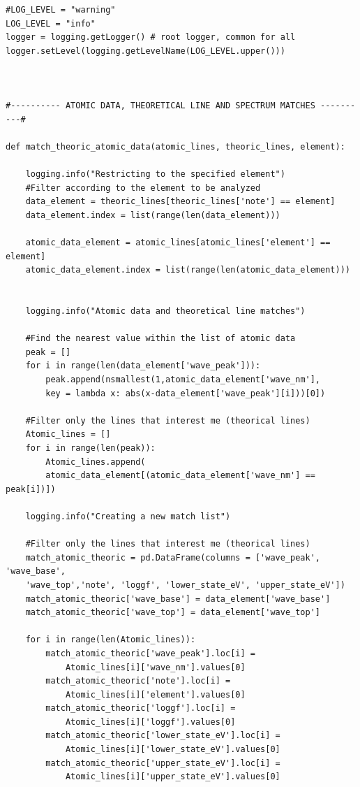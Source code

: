 \documentclass[12pt,oneside,openany,letter]{book}
\begin{document}
\begin{verbatim}
#LOG_LEVEL = "warning"
LOG_LEVEL = "info"
logger = logging.getLogger() # root logger, common for all
logger.setLevel(logging.getLevelName(LOG_LEVEL.upper()))



#---------- ATOMIC DATA, THEORETICAL LINE AND SPECTRUM MATCHES ----------#

def match_theoric_atomic_data(atomic_lines, theoric_lines, element):

    logging.info("Restricting to the specified element")
    #Filter according to the element to be analyzed
    data_element = theoric_lines[theoric_lines['note'] == element]
    data_element.index = list(range(len(data_element)))
    
    atomic_data_element = atomic_lines[atomic_lines['element'] == element]
    atomic_data_element.index = list(range(len(atomic_data_element)))


    logging.info("Atomic data and theoretical line matches")

    #Find the nearest value within the list of atomic data
    peak = []
    for i in range(len(data_element['wave_peak'])):
        peak.append(nsmallest(1,atomic_data_element['wave_nm'], 
        key = lambda x: abs(x-data_element['wave_peak'][i]))[0])

    #Filter only the lines that interest me (theorical lines)
    Atomic_lines = []
    for i in range(len(peak)):
        Atomic_lines.append(
        atomic_data_element[(atomic_data_element['wave_nm'] == peak[i])])

    logging.info("Creating a new match list")

    #Filter only the lines that interest me (theorical lines) 
    match_atomic_theoric = pd.DataFrame(columns = ['wave_peak', 'wave_base',
    'wave_top','note', 'loggf', 'lower_state_eV', 'upper_state_eV'])
    match_atomic_theoric['wave_base'] = data_element['wave_base']
    match_atomic_theoric['wave_top'] = data_element['wave_top']

    for i in range(len(Atomic_lines)):
        match_atomic_theoric['wave_peak'].loc[i] =
            Atomic_lines[i]['wave_nm'].values[0]
        match_atomic_theoric['note'].loc[i] =
            Atomic_lines[i]['element'].values[0]
        match_atomic_theoric['loggf'].loc[i] =
            Atomic_lines[i]['loggf'].values[0]
        match_atomic_theoric['lower_state_eV'].loc[i] =
            Atomic_lines[i]['lower_state_eV'].values[0]
        match_atomic_theoric['upper_state_eV'].loc[i] =
            Atomic_lines[i]['upper_state_eV'].values[0]


\end{verbatim}
\end{document}
